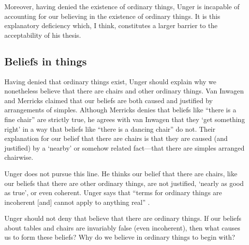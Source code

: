\documentclass[11pt]{article}
\begin{document}
\begin{spacing}{1.5}
\begin{comment}
It is because we do seem to use color and other words in a consistent
way that the sorites paradoxes are troubling.  Unger's conclusion is
that there is no such consistency.  But where do we get this
impression of consistency in the first place?

I am not sure how Unger would reply (though I'll try to think of
something).  
\end{comment}

Moreover, having denied the existence of ordinary things, Unger is
incapable of accounting for our believing in the existence of ordinary
things.  It is this explanatory deficiency which, I think, constitutes
a larger barrier to the acceptability of his thesis.

\subsection{Beliefs in things}
\label{u-belief}
Having denied that ordinary things exist, Unger should explain why we
nonetheless believe that there are chairs and other ordinary things.
Van Inwagen and Merricks claimed that our beliefs are both caused and
justified by arrangements of simples.  Although Merricks denies that
beliefs like ``there is a fine chair'' are strictly true, he agrees with
van Inwagen that they `get something right' in a way that beliefs like
``there is a dancing chair'' do not.  Their explanation for our
belief that there are chairs is that they are caused (and justified)
by a `nearby' or somehow related fact---that there are simples
arranged chairwise.  

Unger does not pursue this line.  He thinks our belief that there are
chairs, like our beliefs that there are other ordinary things, are not
justified, `nearly as good as true', or even coherent.  Unger says
that ``terms for ordinary things are incoherent [and] cannot apply to
anything real'' \citep[147]{unger1979}.

Unger should not deny that believe that there are ordinary things.  If
our beliefs about tables and chairs are invariably false (even
incoherent), then what causes us to form these beliefs?  Why do we
believe in ordinary things to begin with?


\end{spacing}
\end{document}

